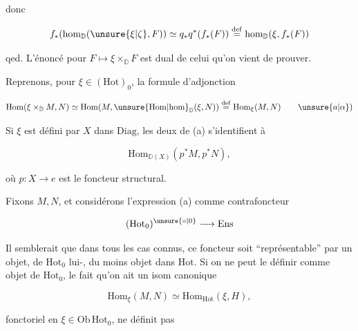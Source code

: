 
donc

\[f_*(\mathrm{hom}_{\mathbb D}(\unsure{\xi|\zeta},F))\simeq q_*q^*(f_*(F))\overset{\mathrm{def}}{=}\mathrm{hom}_{\mathbb D}(\xi,f_*(F))\]

qed. L'énoncé pour $F\mapsto\xi\times_{\mathbb D}F$ est dual de celui qu'on vient de prouver.

Reprenons, pour $\xi\in(\mathrm{Hot})_0$, la formule d'adjonction

\[\mathrm{Hom}(\xi\times_{\mathbb D}M,N)\simeq\mathrm{Hom}(M,\unsure{\mathrm{Hom}|\mathrm{hom}}_{\mathbb D}(\xi,N))\overset{\mathrm{def}}{=}\mathrm{Hom}_{\xi}(M,N)\tag*{\(\unsure{a|\alpha})\)}\]


Si $\xi$ est défini par $X$ dans $\mathrm{Diag}$, les deux  de (a) s'identifient à

\[\mathrm{Hom}_{\mathbb D(X)}(p^*M,p^*N),\]

où $p:X\longrightarrow e$ est le foncteur structural.

Fixons $M,N$, et considérons l'expression (a) comme contrafoncteur

\[(\mathrm{Hot}_0)^{\unsure{\circ|0}}\longrightarrow\mathrm{Ens}\]

Il semblerait que dans tous les cas connus, ce foncteur soit ``représentable'' par un objet,  de $\mathrm{Hot}_0$ lui-, du moins objet dans $\mathrm{Hot}$.  Si on ne peut le définir comme objet  de $\mathrm{Hot}_0$, le fait qu'on ait un isom canonique

\[\mathrm{Hom}_{\xi}(M,N)\simeq\mathrm{Hom}_{\mathrm{Hot}}(\xi,H),\tag*{(10)}\]

fonctoriel en $\xi\in\mathrm{Ob}\,\mathrm{Hot}_0$, ne définit pas 

